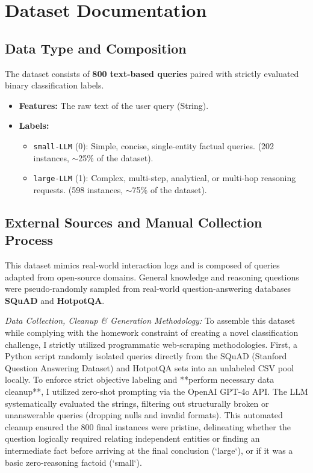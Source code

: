 \documentclass[12pt, a4paper]{article}
\begin{document}
\section{Dataset Documentation}

\subsection{Data Type and Composition}
The dataset consists of \textbf{800 text-based queries} paired with strictly evaluated binary classification labels. 
\begin{itemize}
    \item \textbf{Features:} The raw text of the user query (String).
    \item \textbf{Labels:} 
    \begin{itemize}
        \item \texttt{small-LLM} (0): Simple, concise, single-entity factual queries. (202 instances, $\sim$25\% of the dataset).
        \item \texttt{large-LLM} (1): Complex, multi-step, analytical, or multi-hop reasoning requests. (598 instances, $\sim$75\% of the dataset).
    \end{itemize}
\end{itemize}

\subsection{External Sources and Manual Collection Process}
This dataset mimics real-world interaction logs and is composed of queries adapted from open-source domains. General knowledge and reasoning questions were pseudo-randomly sampled from real-world question-answering databases \textbf{SQuAD} and \textbf{HotpotQA}.

\textit{Data Collection, Cleanup \& Generation Methodology:}
To assemble this dataset while complying with the homework constraint of creating a novel classification challenge, I strictly utilized programmatic web-scraping methodologies. First, a Python script randomly isolated queries directly from the SQuAD (Stanford Question Answering Dataset) and HotpotQA sets into an unlabeled CSV pool locally. To enforce strict objective labeling and **perform necessary data cleanup**, I utilized zero-shot prompting via the OpenAI GPT-4o API. The LLM systematically evaluated the strings, filtering out structurally broken or unanswerable queries (dropping nulls and invalid formats). This automated cleanup ensured the 800 final instances were pristine, delineating whether the question logically required relating independent entities or finding an intermediate fact before arriving at the final conclusion (`large`), or if it was a basic zero-reasoning factoid (`small`).
\end{document}
